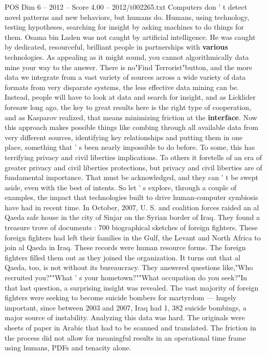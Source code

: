\begin{textsample}{POS Dim 6 – 2012 – Score 4.00 – 2012/t002265.txt}
Computers don ' t detect novel patterns and new behaviors, but humans do.
Humans, using technology, testing hypotheses, searching for insight by asking machines to do things for them.
Osama bin Laden was not caught by artificial intelligence.
He was caught by dedicated, resourceful, brilliant people in partnerships with \textbf{various} technologies.
As appealing as it might sound, you cannot algorithmically data mine your way to the answer.
There is no"Find Terrorist"button, and the more data we integrate from a vast variety of sources across a wide variety of data formats from very disparate systems, the less effective data mining can be.
Instead, people will have to look at data and search for insight, and as Licklider foresaw long ago, the key to great results here is the right type of cooperation, and as Kasparov realized, that means minimizing friction at the \textbf{interface}.
Now this approach makes possible things like combing through all available data from very different sources, identifying key relationships and putting them in one place, something that ' s been nearly impossible to do before.
To some, this has terrifying privacy and civil liberties implications.
To others it foretells of an era of greater privacy and civil liberties protections, but privacy and civil liberties are of fundamental importance.
That must be acknowledged, and they can ' t be swept aside, even with the best of intents.
So let ' s explore, through a couple of examples, the impact that technologies built to drive human-computer symbiosis have had in recent time.
In October, 2007, U.
S. and coalition forces raided an al Qaeda safe house in the city of Sinjar on the Syrian border of Iraq.
They found a treasure trove of documents : 700 biographical sketches of foreign fighters.
These foreign fighters had left their families in the Gulf, the Levant and North Africa to join al Qaeda in Iraq.
These records were human resource forms.
The foreign fighters filled them out as they joined the organization.
It turns out that al Qaeda, too, is not without its bureaucracy.
They answered questions like,"Who recruited you?""What ' s your hometown?""What occupation do you seek?"In that last question, a surprising insight was revealed.
The vast majority of foreign fighters were seeking to become suicide bombers for martyrdom — hugely important, since between 2003 and 2007, Iraq had 1, 382 suicide bombings, a major source of instability.
Analyzing this data was hard.
The originals were sheets of paper in Arabic that had to be scanned and translated.
The friction in the process did not allow for meaningful results in an operational time frame using humans, PDFs and tenacity alone.

\end{textsample}
